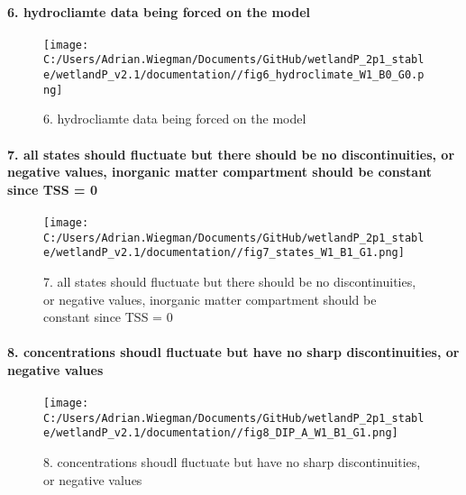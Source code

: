 \documentclass[
]{article}
\begin{document}
\hypertarget{hydrocliamte-data-being-forced-on-the-model}{%
\paragraph{6. hydrocliamte data being forced on the
model}\label{hydrocliamte-data-being-forced-on-the-model}}

\begin{figure}
\centering
\texttt{[image: C:/Users/Adrian.Wiegman/Documents/GitHub/wetlandP\_2p1\_stable/wetlandP\_v2.1/documentation//fig6\_hydroclimate\_W1\_B0\_G0.png]}
\caption{6. hydrocliamte data being forced on the model}
\end{figure}

\hypertarget{all-states-should-fluctuate-but-there-should-be-no-discontinuities-or-negative-values-inorganic-matter-compartment-should-be-constant-since-tss-0}{%
\paragraph{7. all states should fluctuate but there should be no
discontinuities, or negative values, inorganic matter compartment should
be constant since TSS =
0}\label{all-states-should-fluctuate-but-there-should-be-no-discontinuities-or-negative-values-inorganic-matter-compartment-should-be-constant-since-tss-0}}

\begin{figure}
\centering
\texttt{[image: C:/Users/Adrian.Wiegman/Documents/GitHub/wetlandP\_2p1\_stable/wetlandP\_v2.1/documentation//fig7\_states\_W1\_B1\_G1.png]}
\caption{7. all states should fluctuate but there should be no
discontinuities, or negative values, inorganic matter compartment should
be constant since TSS = 0}
\end{figure}

\hypertarget{concentrations-shoudl-fluctuate-but-have-no-sharp-discontinuities-or-negative-values}{%
\paragraph{8. concentrations shoudl fluctuate but have no sharp
discontinuities, or negative
values}\label{concentrations-shoudl-fluctuate-but-have-no-sharp-discontinuities-or-negative-values}}

\begin{figure}
\centering
\texttt{[image: C:/Users/Adrian.Wiegman/Documents/GitHub/wetlandP\_2p1\_stable/wetlandP\_v2.1/documentation//fig8\_DIP\_A\_W1\_B1\_G1.png]}
\caption{8. concentrations shoudl fluctuate but have no sharp
discontinuities, or negative values}
\end{figure}
\end{document}
